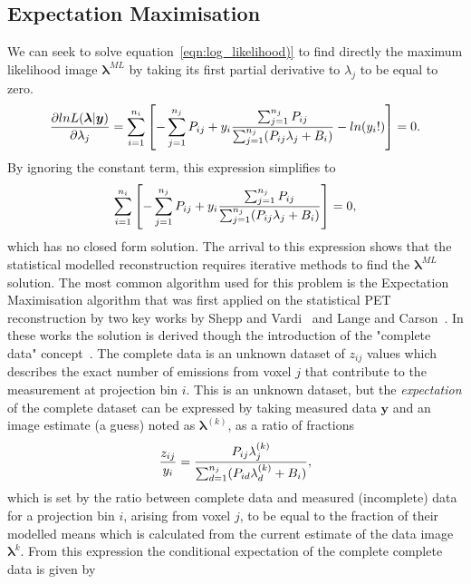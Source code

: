 \subsection{Expectation Maximisation}
We can seek to solve equation~\ref{eqn:log_likelihood)} to find directly the maximum likelihood image $\bm{\lambda}^{ML}$ by taking its first partial derivative to $\lambda_j$ to be equal to zero. 
\begin{equation}
\frac{\partial lnL(\bm{\lambda}|\bm{y})}{\partial \lambda_j} = \sum_{i=1}^{n_i}\left[  -\sum_{j=1}^{n_j} P_{ij} + 
y_i \frac{\sum_{j=1}^{n_j} P_{ij} }{\sum_{j=1}^{n_j} (P_{ij} \lambda_j + B_i)}
- ln({y_i}!) \right]  = 0 \\. 
\end{equation}
By ignoring the constant term, this expression simplifies to 
\begin{equation}
\sum_{i=1}^{n_i}\left[  -\sum_{j=1}^{n_j} P_{ij} + 
y_i \frac{\sum_{j=1}^{n_j} P_{ij} }{\sum_{j=1}^{n_j} (P_{ij} \lambda_j + B_i)} \right]  = 0 \\,
\end{equation}
which has no closed form solution. The arrival to this expression shows that the statistical modelled reconstruction requires iterative methods to find the $\bm{\lambda}^{ML}$ solution. The most common algorithm used for this problem is the Expectation Maximisation algorithm that was first applied on the statistical PET reconstruction by two key works by Shepp and Vardi~\cite{Vardi1985} and Lange and Carson~\cite{Lange1984}. In these works the solution is derived though the introduction of the "complete data" concept~\cite{Dempster1977}. The complete data is an unknown dataset of $z_{ij}$ values which describes the exact number of emissions from voxel $j$ that contribute to the measurement at projection bin $i$. This is an unknown dataset, but the \textit{expectation} of the complete dataset can be expressed by taking measured data $\bm{y}$ and an image estimate (a guess) noted as $\bm{\lambda}^{(k)}$, as a ratio of fractions
\begin{equation}
\frac{z_{ij}}{y_i} = 
\frac{P_{ij} \lambda_j^{(k)}}{\sum_{d=1}^{n_j} (P_{id}\lambda_d^{(k)} + B_i)} \\,
\end{equation}
which is set by the ratio between complete data and measured (incomplete) data for a projection bin $i$, arising from voxel $j$, to be equal to the fraction of their modelled means which is calculated from the current estimate of the data image  $\bm{\lambda}^k$. From this expression the conditional expectation of the complete complete data is given by
